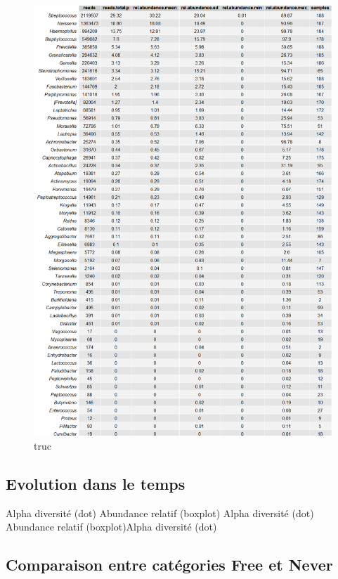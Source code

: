 \documentclass[12pt,a4paper]{article}
\begin{document}
\begin{figure}[!ht]
\begin{center}
\includegraphics[scale=0.5]{img/all_table.png}\hfill
\end{center}
\caption{truc}
\label{bach}
\end{figure}






\subsection{Evolution dans le temps}
Alpha diversité (dot)
Abundance relatif (boxplot)
Alpha diversité (dot)
Abundance relatif (boxplot)Alpha diversité (dot)

\subsection{Comparaison entre catégories Free et Never}
\end{document}
